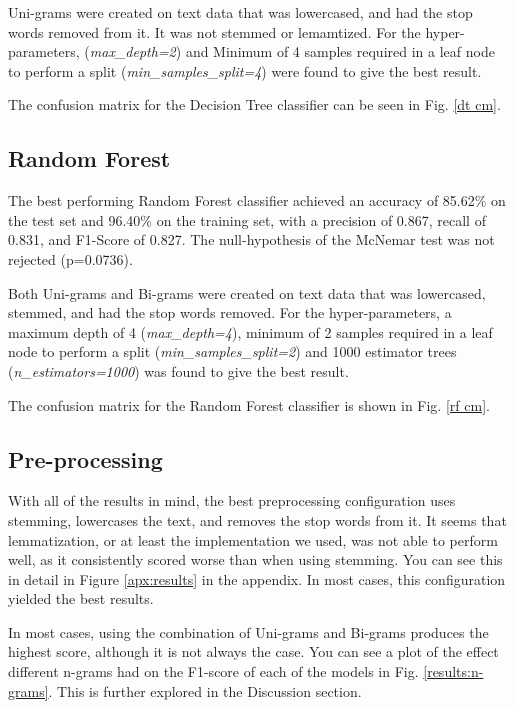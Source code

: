 \documentclass[a4paper, 11pt]{article}
\begin{document}
\begin{multicols}{2}
Uni-grams were created on text data that was lowercased, and had the stop words removed from it. It was not stemmed or lemamtized. For the hyper-parameters, (\emph{max\_depth=2}) and Minimum of 4 samples required in a leaf node to perform a split (\emph{min\_samples\_split=4}) were found to give the best result. 

The confusion matrix for the Decision Tree classifier can be seen in Fig. \ref{dt cm}.

\subsection{Random Forest}

The best performing Random Forest classifier achieved an accuracy of 85.62\% on the test set and 96.40\% on the training set, with a precision of 0.867, recall of 0.831, and F1-Score of 0.827. The null-hypothesis of the McNemar test was not rejected (p=0.0736). 

Both Uni-grams and Bi-grams were created on text data that was lowercased, stemmed, and had the stop words removed. For the hyper-parameters, a maximum depth of 4 (\emph{max\_depth=4}), minimum of 2 samples required in a leaf node to perform a split (\emph{min\_samples\_split=2}) and 1000 estimator trees (\emph{n\_estimators=1000}) was found to give the best result.

The confusion matrix for the Random Forest classifier is shown in Fig. \ref{rf cm}.


\subsection{Pre-processing}
With all of the results in mind, the best preprocessing configuration uses stemming, lowercases the text, and removes the stop words from it. It seems that lemmatization, or at least the implementation we used, was not able to perform well, as it consistently scored worse than when using stemming. You can see this in detail in Figure \ref{apx:results} in the appendix. In most cases, this configuration yielded the best results.

In most cases, using the combination of Uni-grams and Bi-grams produces the highest score, although it is not always the case. You can see a plot of the effect different n-grams had on the F1-score of each of the models in Fig. \ref{results:n-grams}. This is further explored in the Discussion section.

\end{multicols}
\end{document}
